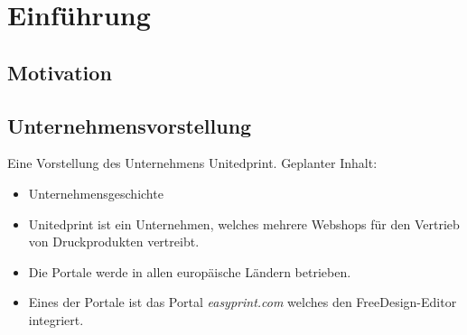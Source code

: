 \chapter{Einführung} 
\section{Motivation}
\section{Unternehmensvorstellung} 
Eine Vorstellung des Unternehmens Unitedprint.
Geplanter Inhalt:
\begin{itemize}
    \item Unternehmensgeschichte
    \item Unitedprint ist ein Unternehmen, welches mehrere Webshops für den Vertrieb von Druckprodukten vertreibt. 
    \item Die Portale werde in allen europäische Ländern betrieben. 
    \item Eines der Portale ist das Portal \emph{easyprint.com} welches den FreeDesign-Editor integriert.
\end{itemize}



% 

